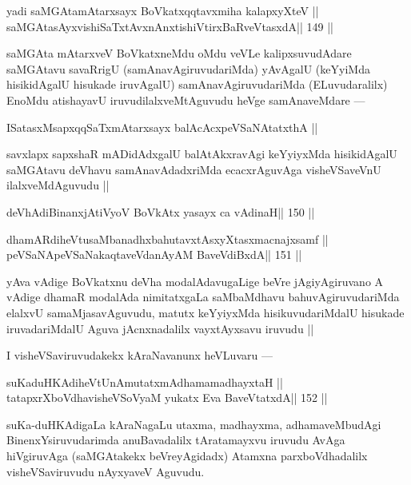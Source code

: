 \begin{shl}
yadi saMGAtamAtarxsayx BoVkatxqqtavxmiha kalapxyXteV ||
saMGAtasAyxvishiSaTxtAvxnAnxtishiVtirxBaRveVtasxdA\hfill || 149 ||
\end{shl}

\begin{artha}
saMGAta mAtarxveV BoVkatxneMdu oMdu veVLe kalipxsuvudAdare saMGAtavu savaRrigU (samAnavAgiruvudariMda) yAvAgalU (keYyiMda hisikidAgalU hisukade iruvAgalU) samAnavAgiruvudariMda (ELuvudaralilx) EnoMdu atishayavU iruvudilalxveMtAguvudu heVge samAnaveMdare ---
\end{artha}

\begin{shl}
ISatasxMsapxqqSaTxmAtarxsayx balAcAcx\s\s peVSaNAtatxthA ||
\end{shl}

\begin{artha}
savxlapx sapxshaR mADidAdxgalU balAtAkxravAgi keYyiyxMda hisikidAgalU saMGAtavu deVhavu samAnavAdadxriMda ecacxrAguvAga visheVSaveVnU ilalxveMdAguvudu ||
\end{artha}

\begin{shl}
deVhAdiBinanxjAtiVyoV BoVkAtx yasayx ca vAdinaH\hfill || 150 ||
\end{shl}

\begin{shl}
dhamARdiheVtusaMbanadhxbahutavxtAsxyXtasxmacnajxsamf ||
peVSaNApeVSaNakaqtaveVdanAyAM BaveVdiBxdA\hfill || 151 ||
\end{shl}

\begin{artha}
yAva vAdige BoVkatxnu deVha modalAdavugaLige beVre jAgiyAgiruvano A vAdige dhamaR modalAda nimitatxgaLa saMbaMdhavu bahuvAgiruvudariMda elalxvU samaMjasavAguvudu, matutx keYyiyxMda hisikuvudariMdalU  hisukade iruvadariMdalU Aguva jAcnxnadalilx vayxtAyxsavu iruvudu ||
\end{artha}

\begin{artha}
I visheVSaviruvudakekx kAraNavanunx heVLuvaru ---
\end{artha}

\begin{shl}
suKaduHKAdiheVtUnAmutatxmAdhamamadhayxtaH ||
tatapxrXboVdhavisheVSoV\s yaM yukatx Eva BaveVtatxdA\hfill || 152 ||
\end{shl}

\begin{artha}
suKa-duHKAdigaLa kAraNagaLu utaxma, madhayxma, adhamaveMbudAgi BinenxYsiruvudarimda anuBavadalilx tAratamayxvu iruvudu AvAga hiVgiruvAga (saMGAtakekx beVreyAgidadx) Atamxna parxboVdhadalilx visheVSaviruvudu nAyxyaveV Aguvudu.
\end{artha}

